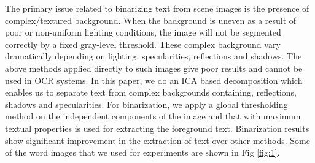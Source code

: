 The primary issue related to binarizing text from scene images is the presence of complex/textured background. 
When the background is uneven as a result of poor or non-uniform lighting conditions, the image will not be 
segmented correctly by a fixed gray-level threshold. These complex background vary dramatically depending on
lighting, specularities, reflections and shadows. The above methods applied directly to such images
give poor results and cannot be used in OCR systems. In this paper, 
we do an ICA based decomposition which enables us to separate text from complex backgrounds containing, reflections,
shadows and specularities. 
For binarization, we apply a global thresholding method on the independent components of the image
and that with maximum textual properties is used for extracting the foreground text. Binarization results show 
significant improvement in the extraction of text over other methods. Some of the word images that we used 
for experiments are shown in Fig \ref{fig:1}.


